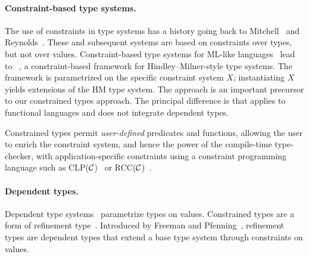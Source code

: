 

\paragraph{Constraint-based type systems.}

The use of constraints in type systems has a history
going back to Mitchell~\cite{mitchell84} and
Reynolds~\cite{reynolds85}.  These and subsequent systems
are based on
constraints over types, but not over values.
Constraint-based type systems for ML-like
languages~\cite{trifonov96,pottier96simplifying}
lead to \hmx~\cite{sulzmann97type}, a constraint-based framework for
Hindley--Milner-style type systems.
The framework is parametrized on
the specific constraint system $X$; instantiating $X$ yields
extensions of the HM type system.
The \hmx{} approach is an important precursor to
our constrained types approach. The principal difference is that
\hmx{} applies to functional languages and does not integrate
dependent types.

Constrained types permit {\em user-defined}
predicates and functions, allowing the user to enrich
the constraint system, and hence the power of the compile-time type-checker,
with application-specific constraints using a constraint
programming language such as CLP($\cal C$)~\cite{clp} or 
RCC($\cal C$)~\cite{DBLP:conf/fsttcs/JagadeesanNS05}.

\paragraph{Dependent types.}

Dependent type
systems~\cite{xi99dependent,calc-constructions,epigram,cayenne}
param\-etrize types on values.  Constrained types are a form of refinement
type~\cite{refinement-types,conditional-types,jones94,sized-types,flanagan-popl06,flanagan-fool06,liquid-types}.
Introduced by Freeman and Pfenning~\cite{refinement-types},
refinement types
are dependent types that extend a base type system through constraints on values.

